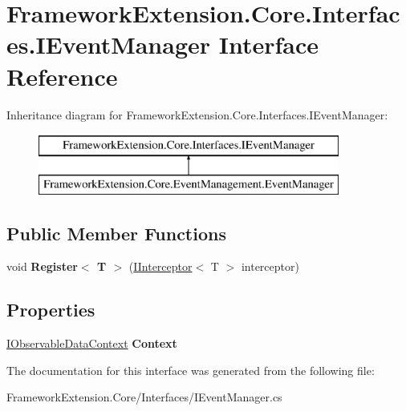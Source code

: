\hypertarget{interface_framework_extension_1_1_core_1_1_interfaces_1_1_i_event_manager}{\section{Framework\-Extension.\-Core.\-Interfaces.\-I\-Event\-Manager Interface Reference}
\label{interface_framework_extension_1_1_core_1_1_interfaces_1_1_i_event_manager}
}
Inheritance diagram for Framework\-Extension.\-Core.\-Interfaces.\-I\-Event\-Manager\-:\begin{figure}[H]
\begin{center}
\leavevmode
\includegraphics[height=2.000000cm]{interface_framework_extension_1_1_core_1_1_interfaces_1_1_i_event_manager}
\end{center}
\end{figure}
\subsection*{Public Member Functions}
\begin{DoxyCompactItemize}
\item 
\hypertarget{interface_framework_extension_1_1_core_1_1_interfaces_1_1_i_event_manager_a5c408030a49298d8f6347c4445fe8240}{void {\bfseries Register$<$ T $>$} (\hyperlink{interface_framework_extension_1_1_core_1_1_interfaces_1_1_i_interceptor-g}{I\-Interceptor}$<$ T $>$ interceptor)}\label{interface_framework_extension_1_1_core_1_1_interfaces_1_1_i_event_manager_a5c408030a49298d8f6347c4445fe8240}

\end{DoxyCompactItemize}
\subsection*{Properties}
\begin{DoxyCompactItemize}
\item 
\hypertarget{interface_framework_extension_1_1_core_1_1_interfaces_1_1_i_event_manager_a8f8e636145ede1602c51468a189548a3}{\hyperlink{interface_framework_extension_1_1_core_1_1_interfaces_1_1_i_observable_data_context}{I\-Observable\-Data\-Context} {\bfseries Context}}\label{interface_framework_extension_1_1_core_1_1_interfaces_1_1_i_event_manager_a8f8e636145ede1602c51468a189548a3}

\end{DoxyCompactItemize}


The documentation for this interface was generated from the following file\-:\begin{DoxyCompactItemize}
\item 
Framework\-Extension.\-Core/\-Interfaces/I\-Event\-Manager.\-cs\end{DoxyCompactItemize}
